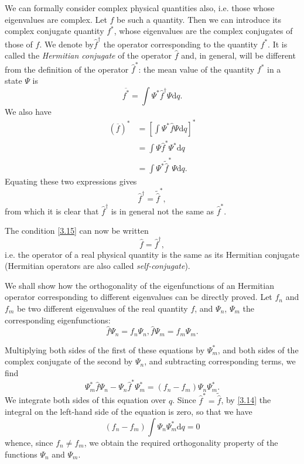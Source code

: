 We can formally consider complex physical quantities also, i.e. those whose eigenvalues are complex. Let $ f $ be such a quantity. Then we can introduce its complex conjugate quantity $ f^* $, whose eigenvalues are the complex conjugates of those of $ f $. We denote by$ \hat{f}^\dag $ the operator corresponding to the quantity $ f^* $. It is called the \textit{Hermitian conjugate} of the operator $ \hat{f} $ and, in general, will be different from the definition of the operator $ \hat{f}^* $: the mean value of the quantity $ f^* $ in a state $ \Psi $ is
\[ \overline{f^*}=\int\Psi^*\hat{f}^\dag\Psi\mathrm{d}q. \]
We also have
\begin{align*}
\left(\overline{f}\right)^*&=\left[ \int\Psi^*\hat{f}\Psi\mathrm{d}q\right]^*\\
&=\int\Psi\hat{f}^*\Psi^*\mathrm{d}q\\
&=\int\Psi^*\tilde{\hat{f}}^*\Psi\mathrm{d}q.
\end{align*}
Equating these two expressions gives
\begin{equation}\label{3.16}
\hat{f}^\dag=\tilde{\hat{f}}^*,
\end{equation}
from which it is clear that $ \hat{f}^\dag $ is in general not the same as $ \hat{f}^* $.

The condition \eqref{3.15} can now be written
\begin{equation}\label{3.17}
\hat{f}=\hat{f}^\dag,
\end{equation}
i.e. the operator of a real physical quantity is the same as its Hermitian conjugate (Hermitian operators are also called \textit{self-conjugate}).

We shall show how the orthogonality of the eigenfunctions of an Hermitian operator corresponding to different eigenvalues can be directly proved. Let $ f_n $ and $ f_m $ be two different eigenvalues of the real quantity $ f $, and $ \Psi_n $, $ \Psi_m $ the corresponding eigenfunctions:
\[ \hat{f}\Psi_n=f_n\Psi_n,\hat{f}\Psi_m=f_m\Psi_m. \]


Multiplying both sides of the first of these equations by $ \Psi_m^* $, and both sides of the complex conjugate of the second by $ \Psi_n $, and subtracting corresponding terms, we find
\[ \Psi_m^*\hat{f}\Psi_n-\Psi_n\hat{f}^*\Psi_m^*=(f_n-f_m)\Psi_n\Psi_m^*. \]
We integrate both sides of this equation over $ q $. Since $ \hat{f}^* = \tilde{\hat{f}} $, by \eqref{3.14} the integral on the left-hand side of the equation is zero, so that we have
\[ (f_n-f_m)\int\Psi_n\Psi_m^*\mathrm{d}q=0 \]
whence, since $ f_n \ne f_m $, we obtain the required orthogonality property of the functions $ \Psi_n $ and $ \Psi_m $.

